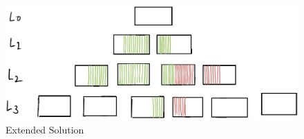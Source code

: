 
\begin{figure}
    \includegraphics[scale=0.45]{Figures/extended-solution.jpg}
    \caption{Extended Solution}\label{fig:extended-solution}
\end{figure}



















